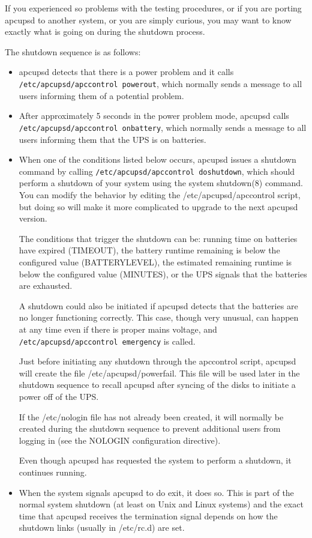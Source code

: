 {{{{{{{{If you experienced so problems with the testing procedures, or if you are
porting apcupsd to another system, or you are simply curious, you may want to
know exactly what is going on during the shutdown process.  

The shutdown sequence is as follows:  

\begin{itemize}
\item apcupsd detects that there is a power problem and it calls {\tt
   /etc/apcupsd/apccontrol powerout}, which normally sends a message to all users
   informing them of a potential problem.  
\item After approximately 5 seconds in the power problem mode, apcupsd calls
   {\tt /etc/apcupsd/apccontrol onbattery}, which normally sends a message to all
   users informing them that the UPS is on batteries.  
\item When one of the conditions listed below occurs, apcupsd issues a
   shutdown command by calling {\tt /etc/apcupsd/apccontrol doshutdown},
   which should perform a shutdown of your system using the system
   shutdown(8) command.  You can modify the behavior by editing the
   /etc/apcupsd/apccontrol script, but doing so will make it more
   complicated to upgrade to the next apcupsd version.
 

The conditions that trigger the shutdown can be: running time on batteries
have expired (TIMEOUT), the battery runtime remaining is below the configured
value (BATTERYLEVEL), the estimated remaining runtime is below the configured
value (MINUTES), or the UPS signals that the batteries are exhausted.  

A shutdown could also be initiated if apcupsd detects that the batteries are
no longer functioning correctly. This case, though very unusual, can happen at
any time even if there is proper mains voltage, and {\tt
/etc/apcupsd/apccontrol emergency} is called.  

Just before initiating any shutdown through the apccontrol script, apcupsd
will create the file /etc/apcupsd/powerfail. This file will be used later in
the shutdown sequence to recall apcupsd after syncing of the disks to initiate
a power off of the UPS.  

If the /etc/nologin file has not already been created, it will normally be
created during the shutdown sequence to prevent additional users from logging
in (see the NOLOGIN configuration directive).  

Even though apcupsd has requested the system to perform a shutdown, it
continues running.  
\item When the system signals apcupsd to do exit, it does so.  This is part of
   the normal system shutdown (at least on Unix and Linux systems) and the exact
   time that apcupsd receives the termination signal depends on how the shutdown
links (usually in /etc/rc.d) are set.  


\end{itemize}}}}}}}}}
